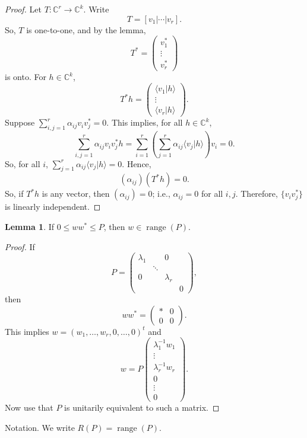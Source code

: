 \documentclass[12pt]{article}
\theoremstyle{definition}
\newtheorem*{lemma}{Lemma}
\newcommand{\C}{\mathbb{C}}
\begin{document}
\begin{proof}
Let $T : \C^r \to \C^k$. Write
\[
T = [v_1|\cdots|v_r].
\]
So, $T$ is one-to-one, and by the lemma,
\[
T^* = \begin{pmatrix}v_1^*\\ \vdots \\ v_r^*\end{pmatrix}
\]
is onto. For $h \in \C^k$,
\[
T^*h = \begin{pmatrix}\langle v_1|h\rangle\\ \vdots \\ \langle v_r|h\rangle\end{pmatrix}.
\]
Suppose $\sum_{i,j=1}^r \alpha_{ij}v_iv_j^* = 0$. This implies, for all $h \in \C^k$,
\[
\sum_{i,j=1}^r \alpha_{ij}v_iv_j^*h = \sum_{i=1}^r \left(\sum_{j=1}^r \alpha_{ij}\langle v_j|h\rangle\right)v_i = 0.
\]
So, for all $i$, $\sum_{j=1}^r \alpha_{ij}\langle v_j|h\rangle = 0$. Hence,
\[
(\alpha_{ij})(T^*h)=0.
\]
So, if $T^*h$ is any vector, then $(\alpha_{ij})=0$; i.e., $\alpha_{ij}=0$ for all $i,j$. Therefore, $\{v_iv_j^*\}$ is linearly independent.
\end{proof}

\begin{lemma}
If $0 \leq ww^* \leq P$, then $w \in \operatorname{range}(P)$.
\end{lemma}

\begin{proof}
If
\[
P = \begin{pmatrix}\lambda_1 & & 0\\ & \ddots & \\ 0 & & \lambda_r \\ & & & 0\end{pmatrix},
\]
then
\[
ww^* = \begin{pmatrix}* & 0\\ 0 & 0\end{pmatrix}.
\]
This implies $w=(w_1,\ldots,w_r,0,\ldots,0)^t$ and
\[
w = P\begin{pmatrix}\lambda_1^{-1}w_1\\ \vdots \\ \lambda_r^{-1}w_r\\ 0\\ \vdots \\ 0\end{pmatrix}.
\]
Now use that $P$ is unitarily equivalent to such a matrix.
\end{proof}

Notation. We write $R(P)=\operatorname{range}(P)$.
\end{document}
